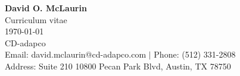 {\Large {\bf David O. McLaurin}} \\
Curriculum vitae \\
\today \\
{\large CD-adapco} \\
Email: david.mclaurin@cd-adapco.com $|$ Phone: (512) 331-2808 \\
Address: Suite 210 10800 Pecan Park Blvd, Austin, TX 78750 \\
